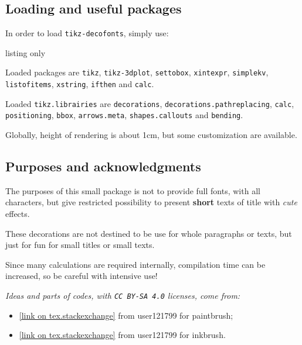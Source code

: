 \documentclass[11pt,a4paper]{ltxdoc}
\begin{document}
\subsection{Loading and useful packages}

In order to load \texttt{tikz-decofonts}, simply use:

\begin{DemoCode}{listing only}
\usepackage{tikz-decofonts}
\end{DemoCode}

Loaded packages are \texttt{tikz}, \texttt{tikz-3dplot}, \texttt{settobox}, \texttt{xintexpr}, \texttt{simplekv}, \texttt{listofitems}, \texttt{xstring}, \texttt{ifthen} and \texttt{calc}.

Loaded \texttt{tikz.librairies} are \texttt{decorations}, \texttt{decorations.pathreplacing}, \texttt{calc}, \texttt{positioning}, \texttt{bbox}, \texttt{arrows.meta}, \texttt{shapes.callouts} and \texttt{bending}.

\smallskip

Globally, height of rendering is about 1cm, but some customization are available.

\subsection{Purposes and acknowledgments}

The purposes of this small package is not to provide full fonts, with all characters, but give restricted possibility to present \textbf{short} texts of title with \textit{cute} effects.

\smallskip

These decorations are not destined to be use for whole paragraphs or texts, but just for fun for small titles or small texts.

\smallskip

Since many calculations are required internally, compilation time can be increased, so be careful with intensive use!

\smallskip

\textit{Ideas and parts of codes, with \texttt{CC\,BY-SA\,4.0} licenses, come from:}

\begin{itemize}
	\item \href{https://tex.stackexchange.com/questions/475141/simulating-paintbrush-strokes-in-tikz}{[link on tex.stackexchange]} from \textsf{user121799} for paintbrush;
	\item \href{https://tex.stackexchange.com/questions/460836/custom-line-cap-to-simulate-inked-line-in-tikz/460842#460842}{[link on tex.stackexchange]} from \textsf{user121799} for inkbrush.
\end{itemize}
\end{document}
